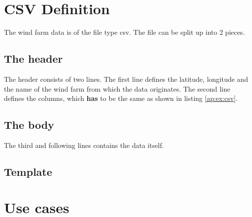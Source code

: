 %
%

\chapter{CSV Definition}
\label{ap:csv}
The wind farm data is of the file type csv. The file can be split up into 2 pieces.
\section{The header}
The header consists of two lines. The first line defines the latitude, longitude and the name of the wind farm from which the data originates.
The second line defines the columns, which \textbf{has} to be the same as shown in listing \ref{ap:ex:csv}.

\section{The body}
The third and following lines contains the data itself.

\section{Template}


\chapter{Use cases}
\label{ap:usecase}

